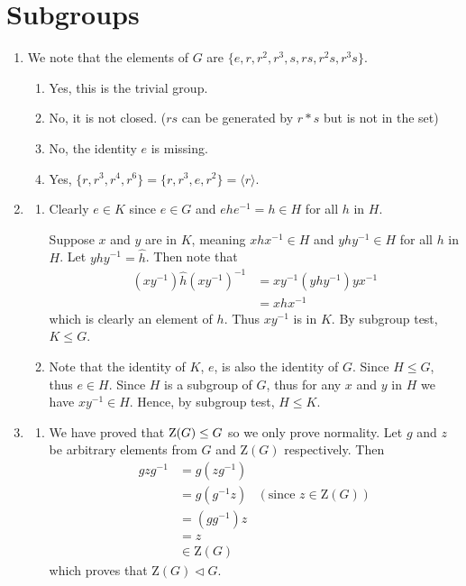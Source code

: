 \section{Subgroups}
\begin{enumerate}
    \item We note that the elements of $G$ are $\{e, r, r^2, r^3, s, rs, r^2s, r^3s\}$.
    \begin{enumerate}[label=(\alph*)]
        \item Yes, this is the trivial group.
        \item No, it is not closed. ($rs$ can be generated by $r \ast s$ but is not in the set)
        \item No, the identity $e$ is missing.
        \item Yes, $\{r, r^3, r^4, r^6\} = \{r, r^3, e, r^2\} = \langle r \rangle$.
    \end{enumerate}

    \item \begin{enumerate}[label=(\alph*)]
        \item Clearly $e \in K$ since $e \in G$ and $ehe^{-1} = h \in H$ for all $h$ in $H$.

        Suppose $x$ and $y$ are in $K$, meaning $xhx^{-1} \in H$ and $yhy^{-1} \in H$ for all $h$ in $H$. Let $yhy^{-1} = \hat{h}$. Then note that
        \begin{align*}
            (xy^{-1})\hat{h}(xy^{-1})^{-1} &= xy^{-1}\left(yhy^{-1}\right)yx^{-1}\\
            &= xhx^{-1}
        \end{align*}
        which is clearly an element of $h$. Thus $xy^{-1}$ is in $K$. By subgroup test, $K \leq G$.

        \item Note that the identity of $K$, $e$, is also the identity of $G$. Since $H \leq G$, thus $e \in H$. Since $H$ is a subgroup of $G$, thus for any $x$ and $y$ in $H$ we have $xy^{-1} \in H$. Hence, by subgroup test, $H \leq K$.
    \end{enumerate}

    \item \begin{enumerate}[label=(\alph*)]
        \item We have proved that $\mathrm{Z}(G) \leq G$ so we only prove normality. Let $g$ and $z$ be arbitrary elements from $G$ and $\mathrm{Z}(G)$ respectively. Then
        \begin{align*}
            gzg^{-1} &= g(zg^{-1})\\
            &= g(g^{-1}z) & (\text{since }z \in \mathrm{Z}(G))\\
            &= (gg^{-1})z \\
            &= z\\
            &\in \mathrm{Z}(G)
        \end{align*}
        which proves that $\mathrm{Z}(G) \lhd G$.


\end{enumerate}
\end{enumerate}
